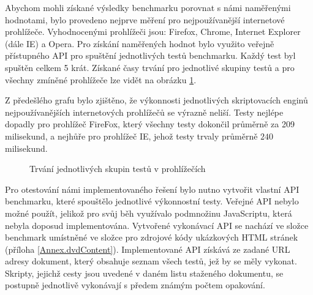 Abychom mohli získané výsledky benchmarku porovnat s námi naměřenými hodnotami, bylo provedeno nejprve měření pro nejpoužívanější internetové prohlížeče. Vyhodnocenými prohlížeči jsou: Firefox, Chrome, Internet Explorer (dále IE) a Opera. Pro získání naměřených hodnot bylo využito veřejně přístupného API pro spuštění jednotlivých testů benchmarku. Každý test byl spuštěn celkem 5 krát. Získané časy trvání pro jednotlivé skupiny testů a pro všechny zmíněné prohlížeče lze vidět na obrázku \ref{Figure.BrowsersComparison}.

Z předešlého grafu bylo zjištěno, že výkonnosti jednotlivých skriptovacích enginů nejpoužívanějších internetových prohlížečů se výrazně neliší. Testy nejlépe dopadly pro prohlížeč FireFox, který všechny testy dokončil průměrně za 209 milisekund, a nejhůře pro prohlížeč IE, jehož testy trvaly průměrně $240$ milisekund.

\begin{figure}[H]
  \begin{center}
    \caption{Trvání jednotlivých skupin testů v prohlížečích}
    \label{Figure.BrowsersComparison}
  \end{center}
\end{figure}

\vspace{-1em}

Pro otestování námi implementovaného řešení bylo nutno vytvořit vlastní API benchmarku, které spouštělo jednotlivé výkonnostní testy. Veřejné API nebylo možné použít, jelikož pro svůj běh využívalo podmnožinu JavaScriptu, která nebyla doposud implementována. Vytvořené vykonávací API se nachází ve složce benchmark umístněné ve složce pro zdrojové kódy ukázkových HTML stránek (příloha \ref{Annex.dvdContent}). Implementované API získává ze zadané URL adresy dokument, který obsahuje seznam všech testů, jež by se měly vykonat. Skripty, jejichž cesty jsou uvedené v daném listu staženého dokumentu, se postupně jednotlivě vykonávají s předem známým počtem opakování.

